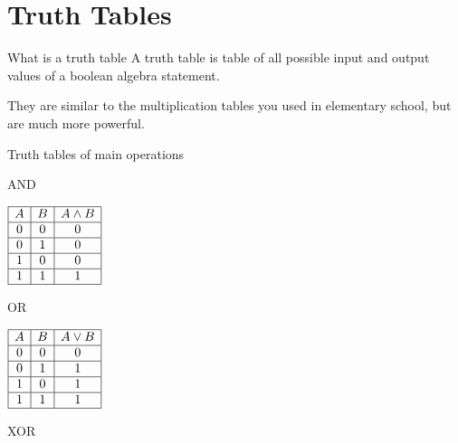 	\section{Truth Tables}
	\begin{namedframe}{What is a truth table}
		A truth table is table of all possible input and output values of a boolean algebra statement.
		\pause

		They are similar to the multiplication tables you used in elementary school, but are much more powerful.
	\end{namedframe}
	\begin{namedframe}{Truth tables of main operations}
		\begin{center}
			\begin{minipage}[t]{0.45\textwidth}
				\pause
				\begin{table}
					\caption{AND}
					\begin{math}
						\begin{array}{|c|c|c|}
							\hline
							A & B & A \wedge B\\\hline
							0 & 0 & 0\\\hline
							0 & 1 & 0\\\hline
							1 & 0 & 0\\\hline
							1 & 1 & 1\\\hline
						\end{array}
					\end{math}
				\end{table}
				\vspace{\baselineskip}
				\pause
				\begin{table}
					\caption{OR}
					\begin{math}
						\begin{array}{|c|c|c|}
							\hline
							A & B & A \vee B\\\hline
							0 & 0 & 0\\\hline
							0 & 1 & 1\\\hline
							1 & 0 & 1\\\hline
							1 & 1 & 1\\\hline
						\end{array}
					\end{math}
				\end{table}
			\end{minipage}
			\begin{minipage}[t]{0.45\textwidth}
				\pause
				\begin{table}
					\caption{XOR}
					\begin{math}

\end{math}
\end{table}
\end{minipage}
\end{center}
\end{namedframe}
